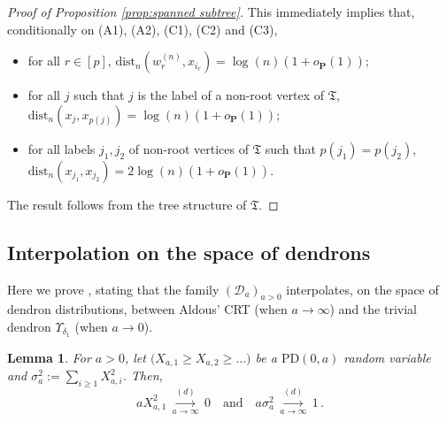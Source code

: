 \documentclass{article}
\newtheorem{lemma}[theorem]{Lemma}
\theoremstyle{remark}
\newcommand{\cv}[1]{\,\underset{#1}{\longrightarrow}\,}
\newcommand{\dist}{\mathrm{dist}}
\newcommand{\cD}{\mathcal{D}}
\newcommand{\bP}{\mathbf{P}}
\newcommand{\PoissonDirichlet}[2]{\mathrm{PD}{\left(#1,#2\right)}}
\begin{document}
\begin{proof}[Proof of Proposition \ref{prop:spanned subtree}]
This immediately implies that, conditionally on (A1), (A2), (C1), (C2) and (C3),
\begin{itemize}
    \item for all $r \in [p]$, $\dist_n(w_r^{(n)},x_{i_r})=\log(n) (1+o_\bP(1))$;
    \item for all $j$ such that $j$ is the label of a non-root vertex of $\mathfrak{T}$, $\dist_n(x_j, x_{p(j)})=\log(n)(1+o_\bP(1))$;
    \item for all labels $j_1,j_2$ of non-root vertices of $\mathfrak{T}$ such that $p(j_1)=p(j_2)$, $\dist_n(x_{j_1},x_{j_2})=2\log(n) (1+o_\bP(1))$.
\end{itemize}
The result follows from the tree structure of $\mathfrak{T}$.
\end{proof}


\subsection{Interpolation on the space of dendrons}
\label{sec: interpolation}

Here we prove , stating that the family $(\cD_a)_{a > 0}$ interpolates, on the space of dendron distributions, between Aldous' CRT (when $a \rightarrow \infty$) and the trivial dendron $\Upsilon_{\delta_1}$ (when $a \rightarrow 0$).

\begin{lemma}\label{lem: asymptotic first term and variance for PD}
    For $a>0$, let $\big( X_{a,1} \ge X_{a,2} \ge \dots \big)$ be a $\PoissonDirichlet{0}{a}$ random variable and $\sigma_a^2 := \sum_{i\ge1} X_{a,i}^2$.
    Then,
    \begin{equation*}
        a X_{a,1}^2 \overset{(d)}{\cv{a\to\infty}} 0
        \quad\text{and}\quad
        a\sigma_a^2 \overset{(d)}{\cv{a\to\infty}} 1 \,.
    \end{equation*}
\end{lemma}
\end{document}
